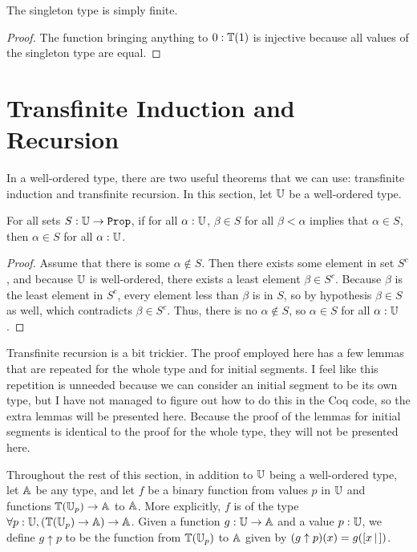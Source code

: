 \documentclass[../../math.tex]{subfiles}
\begin{document}
\begin{theorem} \label{singleton_simple_finite}
    The singleton type is simply finite.
\end{theorem}
\begin{proof}
    The function bringing anything to $0 : \mathbb{T}(1)$ is injective because all
    values of the singleton type are equal.
\end{proof}

\section{Transfinite Induction and Recursion}

In a well-ordered type, there are two useful theorems that we can use:
transfinite induction and transfinite recursion.  In this section, let $\mathbb{U}$ be a
well-ordered type.

\begin{theorem} \label{transfinite_induction}
    For all sets $S : \set{\U}$, if for all $\alpha : \mathbb{U}$, $\beta \in S$ for all
    $\beta < \alpha$ implies that $\alpha \in S$, then $\alpha \in S$ for all
    $\alpha : \mathbb{U}$.
\end{theorem}
\begin{proof}
    Assume that there is some $\alpha \notin S$.  Then there exists some element
    in set $S^c$, and because $\mathbb{U}$ is well-ordered, there exists a least element
    $\beta \in S^c$.  Because $\beta$ is the least element in $S^c$, every
    element less than $\beta$ is in $S$, so by hypothesis $\beta \in S$ as well,
    which contradicts $\beta \in S^c$.  Thus, there is no $\alpha \notin S$, so
    $\alpha \in S$ for all $\alpha : \mathbb{U}$.
\end{proof}

Transfinite recursion is a bit trickier.  The proof employed here has a few
lemmas that are repeated for the whole type and for initial segments.  I feel
like this repetition is unneeded because we can consider an initial segment to
be its own type, but I have not managed to figure out how to do this in the Coq
code, so the extra lemmas will be presented here.  Because the proof of the
lemmas for initial segments is identical to the proof for the whole type, they
will not be presented here.

Throughout the rest of this section, in addition to $\mathbb{U}$ being a well-ordered
type, let $\mathbb{A}$ be any type, and let $f$ be a binary function from values $p$ in
$\mathbb{U}$ and functions $\mathbb{T}(\mathbb{U}_p) \to \mathbb{A}$ to $\mathbb{A}$.  More explicitly, $f$ is of the
type $\forall p : \mathbb{U}, (\mathbb{T}(\mathbb{U}_p) \to \mathbb{A}) \to \mathbb{A}$.  Given a function $g : \mathbb{U} \to
\mathbb{A}$ and a value $p : \mathbb{U}$, we define $g \uparrow p$ to be the function from
$\mathbb{T}(\mathbb{U}_p)$ to $\mathbb{A}$ given by $(g \uparrow p)(x) = g([ x\, |\,])$.
\end{document}
